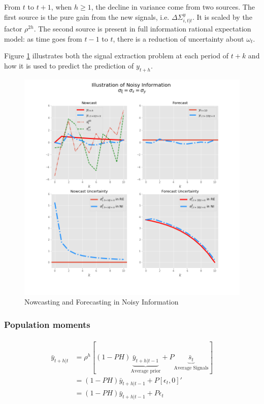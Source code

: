 \documentclass[]{article}
\begin{document}
	From $t$ to $t+1$, when $h\geq 1$, the decline in variance come from two sources. The first source is the pure gain from the new signals, i.e. $\Delta \Sigma^y_{i,t|t}$. It is scaled by the factor $\rho^{2h}$. The second source is present in full information rational expectation model: as time goes from $t-1$ to $t$, there is a reduction of uncertainty about $\omega_t$.
	
	Figure \ref{IllustrateNI} illustrates both the signal extraction problem at each period of $t+k$ and how it is used to predict the prediction of $y_{t+h}$. 
	
	
	\begin{figure}[ht]
		\centering
		\includegraphics[width=13cm]{figures/ni_illustration.png}  
		\caption{Nowcasting and Forecasting in Noisy Information}
		\label{IllustrateNI}
	\end{figure}
	
	
	\subsubsection{Population moments}
	
	\begin{eqnarray}
		\begin{aligned}
			\bar y_{t+h|t} & = \rho^h [(1-PH) \underbrace{\bar  y_{t+h|t-1}}_{\text{Average prior}} + P \underbrace{\bar s_{t}}_{\text{Average Signals}}] \\
			& = (1-PH) \bar y_{t+h|t-1}+ P [\epsilon_t, 0]' \\
			& = (1-PH) \bar y_{t+h|t-1} + P \epsilon_t
		\end{aligned}
	\end{eqnarray}
	
\end{document}
